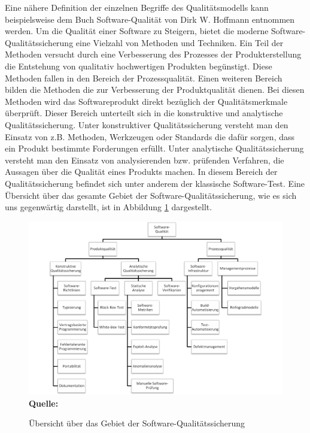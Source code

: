 Eine nähere Definition der einzelnen Begriffe des Qualitätsmodells kann beispielsweise dem Buch Software-Qualität von Dirk W. Hoffmann entnommen werden. \cite[S.7 ff.]{hoffmann_software-qualitat_2013}
Um die Qualität einer Software zu Steigern, bietet die moderne Software-Qualitätssicherung eine Vielzahl von Methoden und Techniken.
Ein Teil der Methoden versucht durch eine Verbesserung des Prozesses der Produkterstellung die Entstehung von qualitativ hochwertigen Produkten begünstigt. Diese Methoden fallen in den Bereich der Prozessqualität.
Einen weiteren Bereich bilden die Methoden die zur Verbesserung der  Produktqualität dienen. Bei diesen Methoden wird das Softwareprodukt direkt bezüglich der Qualitätsmerkmale überprüft. Dieser Bereich unterteilt sich in die konstruktive und analytische Qualitätssicherung. \cite[vgl. S.19 ff.]{hoffmann_software-qualitat_2013} Unter konstruktiver Qualitätssicherung versteht man den Einsatz von z.B. Methoden, Werkzeugen oder Standards die
dafür sorgen, dass ein Produkt bestimmte Forderungen erfüllt. 
Unter analytische Qualitätssicherung versteht man den Einsatz von analysierenden bzw. prüfenden Verfahren, die Aussagen
über die Qualität eines Produkts machen. \cite{prof._dr._r._lindermeier_projekt-_2006}
In diesem Bereich der Qualitätssicherung befindet sich unter anderem der klassische Software-Test. Eine Übersicht über das gesamte Gebiet der Software-Qualitätssicherung, wie es sich uns gegenwärtig darstellt, ist in Abbildung \ref{fig:softwareQualitätssicherung} dargestellt. 
\begin{figure}[htb]
  \centering  
  \includegraphics[scale=0.7]{img/softwarequalitaet.png}\\
  \footnotesize\sffamily\textbf{Quelle:} \cite[vgl. S.20]{hoffmann_software-qualitat_2013}
  \caption{Übersicht über das Gebiet der Software-Qualitätssicherung}
  \label{fig:softwareQualitätssicherung}
\end{figure}



